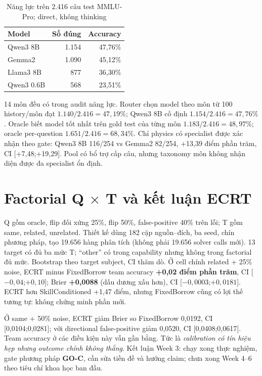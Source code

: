 \documentclass[11pt,a4paper,openany]{book}
\newcommand{\status}[1]{\textbf{#1}}
\begin{document}
\begin{table}[htbp]\centering\small\caption{Năng lực trên 2.416 câu test MMLU-Pro; direct, không thinking}\label{tab:mmlu}\begin{tabular}{lrr}\toprule Model & Số đúng & Accuracy \\ \midrule Qwen3 8B & 1.154 & 47,76\% \\ Gemma2 & 1.090 & 45,12\% \\ Llama3 8B & 877 & 36,30\% \\ Qwen3 0.6B & 568 & 23,51\% \\ \bottomrule\end{tabular}\end{table}

14 môn đều có trong audit năng lực. Router chọn model theo môn từ 100 history/môn đạt \(1.140/2.416=47,19\%\); Qwen3 8B cố định \(1.154/2.416=47,76\%\). Oracle biết model tốt nhất trên gold test của từng môn \(1.183/2.416=48,97\%\); oracle per-question \(1.651/2.416=68,34\%\). Chỉ physics có specialist được xác nhận theo gate: Qwen3 8B 116/254 vs Gemma2 82/254, +13,39 điểm phần trăm, CI [+7,48;+19,29]. Pool có bổ trợ cấp câu, nhưng taxonomy môn không nhận diện được đa specialist ổn định.

\section[Factorial Q x T và kết luận ECRT]{Factorial Q $\times$ T và kết luận ECRT}
Q gồm oracle, flip đối xứng 25\%, flip 50\%, false-positive 40\% trên lỗi; T gồm same, related, unrelated. Thiết kế dùng 182 cặp nguồn--đích, ba seed, chín phương pháp, tạo 19.656 hàng phân tích (không phải 19.656 solver calls mới). 13 target có đủ ba mức T; ``other'' có trong capability nhưng không trong factorial đủ mức. Bootstrap theo target subject, CI thăm dò. Ở cell chính related + 25\% noise, ECRT minus FixedBorrow team accuracy \textbf{+0,02 điểm phần trăm}, CI [\(-0,04\);\(+0,10\)]; Brier \textbf{+0,0088} (dấu dương xấu hơn), CI [\(-0,0003\);\(+0,0181\)]. ECRT hơn SkillConditioned +1,47 điểm, nhưng FixedBorrow cũng có lợi thế tương tự: không chứng minh phần mới.

Ở same + 50\% noise, ECRT giảm Brier so FixedBorrow 0,0192, CI [0,0104;0,0281]; với directional false-positive giảm 0,0520, CI [0,0408;0,0617]. Team accuracy ở các điều kiện này vẫn gần bằng. Tức là \emph{calibration có tín hiệu hẹp nhưng outcome chính không thắng}. Kết luận Week 3: chạy xong thực nghiệm, gate phương pháp \status{GO-C}, cần sửa tiền đề và hướng claim; chưa xong Week 4--6 theo tiêu chí khoa học ban đầu.
\end{document}
